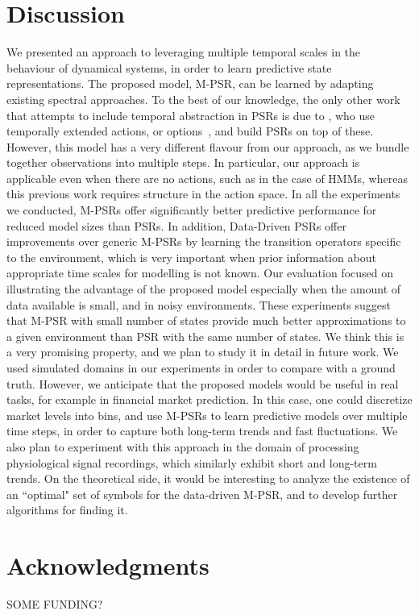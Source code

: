\documentclass[letterpaper]{article}
\begin{document}
\section{Discussion}

We presented an approach to leveraging multiple temporal scales in the behaviour of dynamical systems, in order to learn predictive state representations.  The proposed model, M-PSR, can be learned by adapting existing spectral approaches. To the best of our knowledge, the only other work that attempts to include temporal abstraction in PSRs is due to \cite{wolfe06}, who use temporally extended actions, or options~\cite{sutton99}, and build PSRs on top of these. However, this model has a very different flavour from our approach, as we bundle together observations into multiple steps. In particular, our approach is applicable even when there are no actions, such as in the case of HMMs, whereas this previous work requires structure in the action space. In all the experiments we conducted, M-PSRs offer significantly better predictive performance for reduced model sizes than PSRs. In addition, Data-Driven PSRs offer improvements over generic M-PSRs by learning the transition operators specific to the environment, which is very important when prior information about appropriate time scales for modelling is not known. Our evaluation focused on illustrating the advantage of the proposed model especially when the amount of data available is small, and in noisy environments. These experiments suggest that M-PSR with small number of states provide much better approximations to a given environment than PSR with the same number of states. We think this is a very promising property, and we plan to study it in detail in future work. We used simulated domains in our experiments in order to compare with a ground truth. However, we anticipate that the proposed models would be useful in real tasks, for example in financial market prediction. In this case, one could discretize market levels into bins, and use M-PSRs to learn predictive models over multiple time steps, in order to capture both long-term trends and fast fluctuations. We also plan to experiment with this approach in the domain of processing physiological signal recordings, which similarly exhibit short and long-term trends. On the theoretical side, it would be interesting to analyze the existence of an ``optimal" set of symbols for the data-driven M-PSR, and to develop further algorithms for finding it.


\section*{Acknowledgments}
SOME FUNDING?



\end{document}
